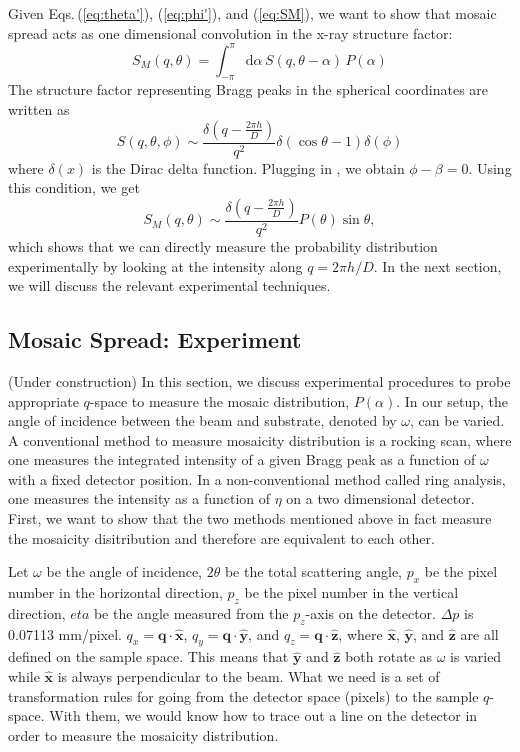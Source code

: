 Given Eqs.\,(\ref{eq:theta'}), (\ref{eq:phi'}), and (\ref{eq:SM}), we want to
 show that
mosaic spread acts as one dimensional convolution in the x-ray structure factor:
\begin{equation}
  S_M(q,\theta) 
    = \int_{-\pi}^{\pi} \mathrm{d}\alpha \, S(q,\theta-\alpha) \, P(\alpha)
  \label{eq:conv}
\end{equation}
The structure factor representing Bragg peaks in the spherical coordinates are 
written as
\begin{equation}
  S(q,\theta,\phi) 
    \sim \frac{\delta(q-\frac{2\pi h}{D})}{q^2} 
         \delta(\cos\theta-1) \delta(\phi)
  \label{eq:Bragg}
\end{equation}
where $\delta(x)$ is the Dirac delta function. Plugging  in 
,
we obtain $\phi-\beta=0$. Using this condition, we get 
\begin{equation}
  S_M(q,\theta) \sim \frac{\delta(q-\frac{2\pi h}{D})}{q^2}P(\theta)\sin\theta,
\end{equation}
which shows that we can directly measure the probability distribution 
experimentally
by looking at the intensity along $q=2\pi h/D$. In the next section, we will 
discuss 
the relevant experimental techniques.

\subsection{Mosaic Spread: Experiment}
(Under construction)
In this section, we discuss experimental procedures to probe appropriate 
$q$-space
to measure the mosaic distribution, $P(\alpha)$. In our setup, the angle of 
incidence between the beam and substrate, denoted by $\omega$, can be varied. A 
conventional method to measure mosaicity distribution is a rocking scan, where
one measures the integrated intensity of a given Bragg peak as a function of 
$\omega$ with a fixed detector position. In a non-conventional method called
ring analysis, one measures the intensity as a function of $\eta$ on a two
dimensional detector. First, we want to show that the two methods mentioned 
above in fact measure the mosaicity disitribution and therefore are equivalent
to each other.

Let $\omega$ be the angle of incidence, $2\theta$ be the total scattering angle,
$p_x$ be the pixel number in the horizontal direction, $p_z$ be the pixel 
number in the vertical direction, $eta$ be the angle measured from the 
$p_z$-axis 
on the detector. $\Delta p$ is 0.07113 mm/pixel. $q_x=\mathbf{q} \cdot 
\hat{\mathbf{x}}$, $q_y=\mathbf{q} \cdot \hat{\mathbf{y}}$, and $q_z=\mathbf{q} 
\cdot \hat{\mathbf{z}}$, 
where $\hat{\mathbf{x}}$, $\hat{\mathbf{y}}$, and $\hat{\mathbf{z}}$ are all 
defined on the sample space. This means that $\hat{\mathbf{y}}$ and 
$\hat{\mathbf{z}}$ both rotate as $\omega$ is varied while $\hat{\mathbf{x}}$ 
is always perpendicular to the beam. What we need is a set of transformation
rules for going from the detector space (pixels) to the sample $q$-space.
With them, we would know how to trace out a line on the detector in order
to measure the mosaicity distribution. 

